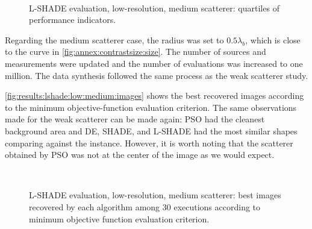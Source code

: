			\begin{figure}
				\centering
				 \\
				\caption[L-SHADE evaluation, low-resolution, medium scatterer: indicators.]{L-SHADE evaluation, low-resolution, medium scatterer: quartiles of performance indicators.}
				\label{fig:results:lshade:low:weak:indicators}
			\end{figure}
					
			Regarding the medium scatterer case, the radius was set to $0.5\lambda_b$, which is close to the curve in \ref{fig:annex:contrastsize:size}. The number of sources and measurements were updated and the number of evaluations was increased to one million. The data synthesis followed the same process as the weak scatterer study.
			
			\autoref{fig:results:lshade:low:medium:images} shows the best recovered images according to the minimum objective-function evaluation criterion. The same observations made for the weak scatterer can be made again: PSO had the cleanest background area and DE, SHADE, and L-SHADE had the most similar shapes comparing against the instance. However, it is worth noting that the scatterer obtained by PSO was not at the center of the image as we would expect.
			
			\begin{figure}
				\centering
				 \\
				\caption[L-SHADE evaluation, low-resolution, medium scatterer: best recovered images.]{L-SHADE evaluation, low-resolution, medium scatterer: best images recovered by each algorithm among 30 executions according to minimum objective function evaluation criterion.}
				\label{fig:results:lshade:low:medium:images}
			\end{figure}
		
